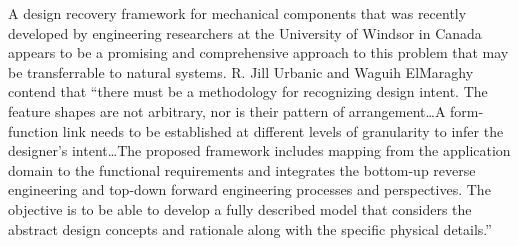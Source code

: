 A design recovery framework for mechanical components that was recently
developed by engineering researchers at the University of Windsor in
Canada appears to be a promising and comprehensive approach to this
problem that may be transferrable to natural systems. R. Jill Urbanic
and Waguih ElMaraghy contend that “there must be a methodology for
recognizing design intent. The feature shapes are not arbitrary, nor is
their pattern of arrangement…A form-function link needs to be
established at different levels of granularity to infer the designer’s
intent…The proposed framework includes mapping from the application
domain to the functional requirements and integrates the bottom-up
reverse engineering and top-down forward engineering processes and
perspectives. The objective is to be able to develop a fully described
model that considers the abstract design concepts and rationale along
with the specific physical details.”\citep{urbanicelmaraghy}

